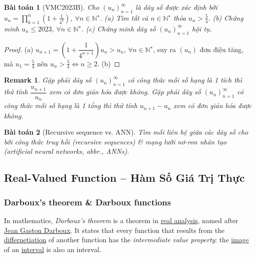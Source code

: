 \documentclass{article}
\newtheorem{baitoan}{Bài toán}
\newtheorem{remark}{Remark}
\begin{document}
\begin{baitoan}[VMC2023B]
	Cho $(u_n)_{n=1}^\infty$ là dãy số được xác định bởi $u_n = \prod_{k=1}^n \left(1 + \frac{1}{4^k}\right)$, $\forall n\in\mathbb{N}^\star$. (a) Tìm tất cả $n\in\mathbb{N}^\star$ thỏa $u_n > \frac{5}{4}$. (b) Chứng minh $u_n\le2023$, $\forall n\in\mathbb{N}^\star$. (c) Chứng minh dãy số $(u_n)_{n=1}^\infty$ hội tụ.
\end{baitoan}

\begin{proof}
	(a) $u_{n+1} = \left(1 + \dfrac{1}{4^{n+1}}\right)u_n > u_n$, $\forall n\in\mathbb{N}^\star$, suy ra $(u_n)$ đơn điệu tăng, mà $u_1 = \frac{5}{4}$ nên $u_n > \frac{5}{4}\Leftrightarrow n\ge2$. (b)
\end{proof}

\begin{remark}
	Gặp phải dãy số $(u_n)_{n=1}^\infty$ có công thức mỗi số hạng là 1 tích thì thử tính $\dfrac{u_{n+1}}{u_n}$ xem có đơn giản hóa được không. Gặp phải dãy số $(u_n)_{n=1}^\infty$ có công thức mỗi số hạng là 1 tổng thì thử tính $u_{n+1} - u_n$ xem có đơn giản hóa được không.
\end{remark}

\begin{baitoan}[Recursive sequence vs. ANN]
	Tìm mối liên hệ giữa các dãy số cho bởi công thức truy hồi (recursive sequences) \& mạng lưới nơ-ron nhân tạo (artificial neural networks, abbr., ANNs).
\end{baitoan}


\subsection{Real-Valued Function -- Hàm Số Giá Trị Thực}

\subsubsection{{\sc Darboux}'s theorem \& Darboux functions}
In mathematics, {\it {\sc Darboux}'s theorem} is a theorem in \href{https://en.wikipedia.org/wiki/Real_analysis}{real analysis}, named after \href{https://en.wikipedia.org/wiki/Jean_Gaston_Darboux}{\sc Jean Gaston Darboux}. It states that every function that results from the \href{https://en.wikipedia.org/wiki/Derivative}{differnetiation} of another function has the {\it intermediate value property}: the \href{https://en.wikipedia.org/wiki/Image_(mathematics)}{image} of an \href{https://en.wikipedia.org/wiki/Interval_(mathematics)}{interval} is also an interval.
\end{document}
